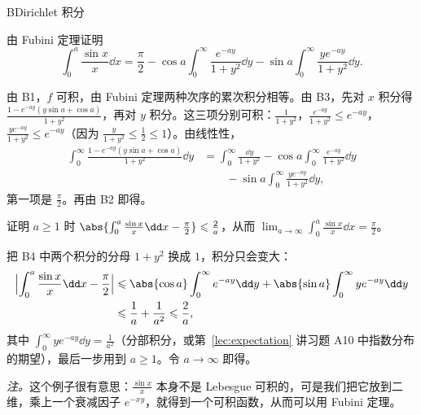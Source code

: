 \begin{probleme}{B}{Dirichlet 积分}
\begin{questions}
\item 由 Fubini 定理证明
\[
\int_0^a\frac{\sin x}x\dd x=\frac\pi2-\cos a\int_0^\infty\frac{e^{-ay}}{1+y^2}\dd y-\sin a\int_0^\infty\frac{ye^{-ay}}{1+y^2}\dd y .
\]
\begin{solution}
由 B1，$f$ 可积，由 Fubini 定理两种次序的累次积分相等。由 B3，先对 $x$ 积分得 $\frac{1-e^{-ay}(y\sin a+\cos a)}{1+y^2}$，再对 $y$ 积分。这三项分别可积：$\frac1{1+y^2}$，$\frac{e^{-ay}}{1+y^2}\leqslant e^{-ay}$，$\frac{ye^{-ay}}{1+y^2}\leqslant e^{-ay}$（因为 $\frac y{1+y^2}\leqslant\frac12\leqslant1$）。由线性性，
\[
\begin{aligned}
\int_0^\infty\frac{1-e^{-ay}(y\sin a+\cos a)}{1+y^2}\dd y&=\int_0^\infty\frac{\dd y}{1+y^2}-\cos a\int_0^\infty\frac{e^{-ay}}{1+y^2}\dd y\\
&\qquad-\sin a\int_0^\infty\frac{ye^{-ay}}{1+y^2}\dd y,
\end{aligned}
\]
第一项是 $\frac\pi2$。再由 B2 即得。
\end{solution}

\item 证明 $a\geqslant1$ 时 $\abs{\int_0^a\frac{\sin x}x\dd x-\frac\pi2}\leqslant\frac2a$，从而 $\lim_{a\to\infty}\int_0^a\frac{\sin x}x\dd x=\frac\pi2$。
\begin{solution}
把 B4 中两个积分的分母 $1+y^2$ 换成 $1$，积分只会变大：
\[
\begin{aligned}
\Bigl\lvert\int_0^a\frac{\sin x}x\dd x-\frac\pi2\Bigr\rvert&\leqslant\abs{\cos a}\int_0^\infty e^{-ay}\dd y+\abs{\sin a}\int_0^\infty ye^{-ay}\dd y\\
&\leqslant\frac1a+\frac1{a^2}\leqslant\frac2a,
\end{aligned}
\]
其中 $\int_0^\infty ye^{-ay}\dd y=\frac1{a^2}$（分部积分，或第~\ref{lec:expectation} 讲习题 A10 中指数分布的期望），最后一步用到 $a\geqslant1$。令 $a\to\infty$ 即得。

\emph{注。}这个例子很有意思：$\frac{\sin x}x$ 本身不是 Lebesgue 可积的，可是我们把它放到二维，乘上一个衰减因子 $e^{-xy}$，就得到一个可积函数，从而可以用 Fubini 定理。
\end{solution}
\end{questions}
\end{probleme}

